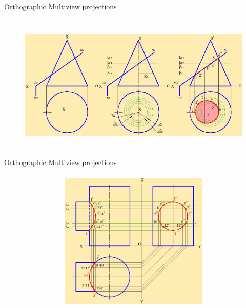 \documentclass[aspectratio=169]{beamer}
\begin{document}
\begin{frame}[t]{Orthographic Multiview projections}
    \framesubtitle{}
    \vspace{-0.6cm}
    \begin{figure}[H]
        \centering\includegraphics[height=6.5cm,width=1\textwidth,keepaspectratio]{resources/multiview_3.png}
        \label{fig:resources/multiview_3.png}
    \end{figure}
\end{frame}

\begin{frame}[t]{Orthographic Multiview projections}
    \framesubtitle{}
    \vspace{-0.6cm}
    \begin{figure}[H]
        \centering\includegraphics[height=6.5cm,width=1\textwidth,keepaspectratio]{resources/multiview_4.png}
        \label{fig:resources/multiview_4.png}
    \end{figure}
\end{frame}
\end{document}
